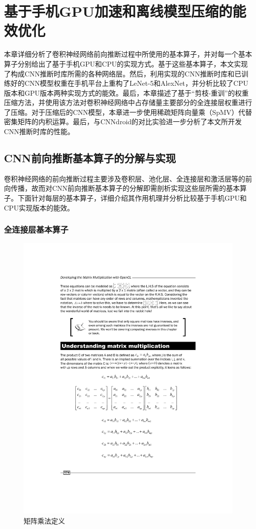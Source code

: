 \chapter{基于手机GPU加速和离线模型压缩的能效优化}
\label{chapter:chapter3}

本章详细分析了卷积神经网络前向推断过程中所使用的基本算子，并对每一个基本算子分别给出了基于手机GPU和CPU的实现方式。基于这些基本算子，本文实现了构成CNN推断时库所需的各种网络层。然后，利用实现的CNN推断时库和已训练好的CNN模型权重在手机平台上重构了LeNet-5和AlexNet，并分析比较了CPU版本和GPU版本两种实现方式的能效。最后，本章描述了基于“剪枝-重训”的权重压缩方法，并使用该方法对卷积神经网络中占存储量主要部分的全连接层权重进行了压缩。对于压缩后的CNN模型，本章进一步使用稀疏矩阵向量乘（SpMV）代替密集矩阵的内积运算。最后，与CNNdroid\cite{latifi2016cnndroid}的对比实验进一步分析了本文所开发CNN推断时库的性能。

\section{CNN前向推断基本算子的分解与实现}
\label{chapter:chapter3-1}
卷积神经网络的前向推断过程主要涉及卷积层、池化层、全连接层和激活层等的前向传播，故而对CNN前向推断基本算子的分解即需剖析实现这些层所需的基本算子。下面针对每层的基本算子，详细介绍其作用机理并分析比较基于手机GPU和CPU实现版本的能效。

\subsection{全连接层基本算子}

\begin{figure}[htbp]
    \begin{center}
    \includegraphics[height=0.5\textwidth]{figures/mat.pdf}
    \end{center}
    \caption{矩阵乘法定义}\label{figure:figure8}
\end{figure}

